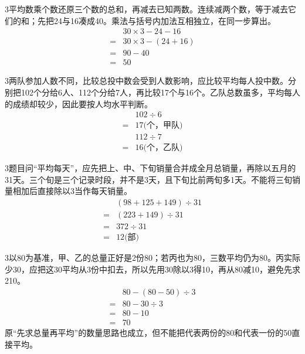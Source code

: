 \documentclass[multi=snippet,border={5bp 20bp 5bp 5bp}]{standalone}
\newenvironment{snippet}[3]{\begin{minipage}{#1bp}\color{answerred}\fontsize{#2}{#3}\selectfont\raggedright}{\end{minipage}}
\begin{document}
\begin{snippet}{505}{11.5}{14}\begin{multicols}{3}\raggedcolumns 平均数乘个数还原三个数的总和，再减去已知两数。连续减两个数，等于减去它们的和；先把24与16凑成40。乘法与括号内加法互相独立，在同一步算出。\[\begin{aligned}&30\times3-24-16\\={}&30\times3-(24+16)\\={}&90-40\\={}&50\end{aligned}\]\end{multicols}\end{snippet}
\begin{snippet}{505}{11.5}{14}\begin{multicols}{3}\raggedcolumns 两队参加人数不同，比较总投中数会受到人数影响，应比较平均每人投中数。分别把102个分给6人、112个分给7人，再比较17个与16个。乙队总数虽多，平均每人的成绩却较少，因此要按人均水平判断。\[\begin{aligned}&102\div6\\={}&17\text{(个，甲队)}\\&112\div7\\={}&16\text{(个，乙队)}\end{aligned}\]\end{multicols}\end{snippet}
\begin{snippet}{505}{11.5}{14}\begin{multicols}{3}\raggedcolumns 题目问“平均每天”，应先把上、中、下旬销量合并成全月总销量，再除以五月的31天。三个旬是三个记录时段，并不是3天，且下旬比前两旬多1天。不能将三旬销量相加后直接除以3当作每天销量。\[\begin{aligned}&(98+125+149)\div31\\={}&(223+149)\div31\\={}&372\div31\\={}&12\text{(部)}\end{aligned}\]\end{multicols}\end{snippet}
\begin{snippet}{505}{11.5}{14}\begin{multicols}{3}\raggedcolumns 以80为基准，甲、乙的总量正好是2份80；若丙也为80，三数平均仍为80。丙实际少30，应把这30平均从3份中扣去，所以先用30除以3得10，再从80减10，避免先求210。\[\begin{aligned}&80-(80-50)\div3\\={}&80-30\div3\\={}&80-10\\={}&70\end{aligned}\]原“先求总量再平均”的数量思路也成立，但不能把代表两份的80和代表一份的50直接平均。\end{multicols}\end{snippet}
\end{document}
